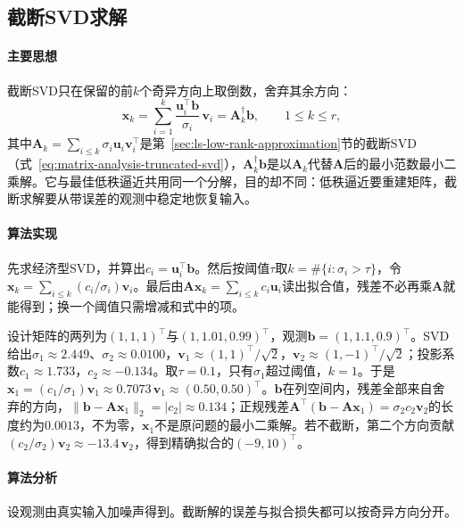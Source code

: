 \subsection{截断SVD求解}
\label{sec:ls-tsvd-solve}

\paragraph{主要思想}
截断SVD只在保留的前$k$个奇异方向上取倒数，舍弃其余方向：
\[
 \bm x_k=\sum_{i=1}^k\frac{\bm u_i^\top\bm b}{\sigma_i}\,\bm v_i=\bm A_k^\dagger\bm b,\qquad 1\leq k\leq r,
\]
其中$\bm A_k=\sum_{i\leq k}\sigma_i\bm u_i\bm v_i^\top$是第~\ref{sec:ls-low-rank-approximation}节的截断SVD（式~\eqref{eq:matrix-analysis-truncated-svd}），$\bm A_k^\dagger\bm b$是以$\bm A_k$代替$\bm A$后的最小范数最小二乘解。它与最佳低秩逼近共用同一个分解，目的却不同：低秩逼近要重建矩阵，截断求解要从带误差的观测中稳定地恢复输入。

\paragraph{算法实现}
先求经济型SVD，并算出$c_i=\bm u_i^\top\bm b$。然后按阈值$\tau$取$k=\#\{i:\sigma_i>\tau\}$，令$\bm x_k=\sum_{i\leq k}(c_i/\sigma_i)\bm v_i$。最后由$\bm A\bm x_k=\sum_{i\leq k}c_i\bm u_i$读出拟合值，残差不必再乘$\bm A$就能得到；换一个阈值只需增减和式中的项。

\begin{example}[近共线设计的截断求解]
\label{ex:ls-tsvd-steps}
设计矩阵的两列为$(1,1,1)^\top$与$(1,1.01,0.99)^\top$，观测$\bm b=(1,1.1,0.9)^\top$。SVD给出$\sigma_1\approx2.449$、$\sigma_2\approx0.0100$，$\bm v_1\approx(1,1)^\top/\sqrt2$，$\bm v_2\approx(1,-1)^\top/\sqrt2$；投影系数$c_1\approx1.733$，$c_2\approx-0.134$。取$\tau=0.1$，只有$\sigma_1$超过阈值，$k=1$。于是$\bm x_1=(c_1/\sigma_1)\bm v_1\approx0.7073\,\bm v_1\approx(0.50,0.50)^\top$。$\bm b$在列空间内，残差全部来自舍弃的方向，$\lVert\bm b-\bm A\bm x_1\rVert_2=|c_2|\approx0.134$；正规残差$\bm A^\top(\bm b-\bm A\bm x_1)=\sigma_2c_2\bm v_2$的长度约为$0.0013$，不为零，$\bm x_1$不是原问题的最小二乘解。若不截断，第二个方向贡献$(c_2/\sigma_2)\bm v_2\approx-13.4\,\bm v_2$，得到精确拟合的$(-9,10)^\top$。
\end{example}

\paragraph{算法分析}
设观测由真实输入加噪声得到。截断解的误差与拟合损失都可以按奇异方向分开。

